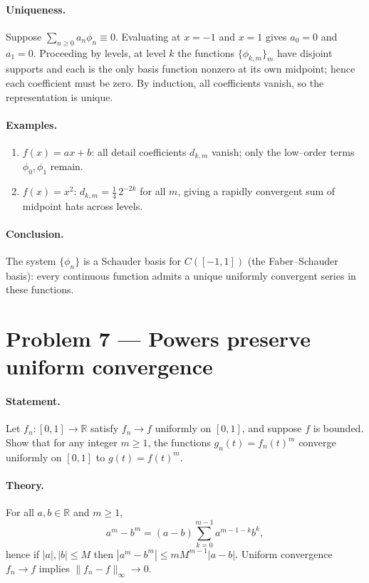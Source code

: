 \documentclass[12pt,a4paper]{article}
\theoremstyle{plain}
\theoremstyle{definition}
\theoremstyle{remark}
\theoremstyle{remark}
\begin{document}
\paragraph{Uniqueness.}
Suppose $\sum_{n\ge0} a_n\phi_n\equiv 0$. Evaluating at $x=-1$ and $x=1$ gives
$a_0=0$ and $a_1=0$. Proceeding by levels, at level $k$ the functions
$\{\phi_{k,m}\}_m$ have disjoint supports and each is the only basis function nonzero at
its own midpoint; hence each coefficient must be zero. By induction, all coefficients vanish,
so the representation is unique.

\paragraph{Examples.}
\begin{enumerate}[label=(\arabic*), leftmargin=*]
	\item $f(x)=ax+b$: all detail coefficients $d_{k,m}$ vanish; only the low–order terms
	$\phi_0,\phi_1$ remain.
	\item $f(x)=x^2$: $d_{k,m}=\frac14\,2^{-2k}$ for all $m$, giving a rapidly convergent sum of
	midpoint hats across levels.
\end{enumerate}

\paragraph{Conclusion.}
The system $\{\phi_n\}$ is a Schauder basis for $C([-1,1])$ (the Faber–Schauder basis):
every continuous function admits a unique uniformly convergent series in these functions.

	
\section*{Problem 7 — Powers preserve uniform convergence}

\paragraph{Statement.}
Let $f_n:[0,1]\to\mathbb{R}$ satisfy $f_n\to f$ uniformly on $[0,1]$, and suppose $f$ is bounded.
Show that for any integer $m\ge1$, the functions $g_n(t)=f_n(t)^m$ converge uniformly on $[0,1]$
to $g(t)=f(t)^m$.

\paragraph{Theory.}
For all $a,b\in\mathbb{R}$ and $m\ge1$,
\[
a^m-b^m=(a-b)\sum_{k=0}^{m-1}a^{m-1-k}b^{k},
\]
hence if $|a|,|b|\le M$ then $|a^m-b^m|\le m M^{m-1}|a-b|$.
Uniform convergence $f_n\to f$ implies $\|f_n-f\|_\infty\to0$.
\end{document}
